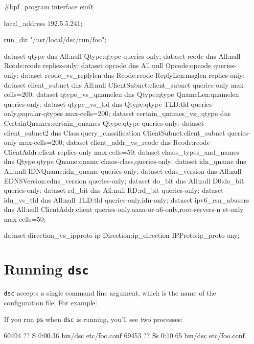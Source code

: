 \documentclass{report}
\begin{document}
\begin{MyVerbatim}
#bpf_program
interface em0;

local_address 192.5.5.241;

run_dir "/usr/local/dsc/run/foo";

dataset qtype dns All:null Qtype:qtype queries-only;
dataset rcode dns All:null Rcode:rcode replies-only;
dataset opcode dns All:null Opcode:opcode queries-only;
dataset rcode_vs_replylen dns Rcode:rcode ReplyLen:msglen replies-only;
dataset client_subnet dns All:null ClientSubnet:client_subnet queries-only
        max-cells=200;
dataset qtype_vs_qnamelen dns Qtype:qtype QnameLen:qnamelen queries-only;
dataset qtype_vs_tld dns Qtype:qtype TLD:tld queries-only,popular-qtypes
        max-cells=200;
dataset certain_qnames_vs_qtype dns CertainQnames:certain_qnames
        Qtype:qtype queries-only;
dataset client_subnet2 dns Class:query_classification
        ClientSubnet:client_subnet queries-only max-cells=200;
dataset client_addr_vs_rcode dns Rcode:rcode ClientAddr:client
        replies-only max-cells=50;
dataset chaos_types_and_names dns Qtype:qtype Qname:qname
        chaos-class,queries-only;
dataset idn_qname dns All:null IDNQname:idn_qname queries-only;
dataset edns_version dns All:null EDNSVersion:edns_version queries-only;
dataset do_bit dns All:null D0:do_bit queries-only;
dataset rd_bit dns All:null RD:rd_bit queries-only;
dataset idn_vs_tld dns All:null TLD:tld queries-only,idn-only;
dataset ipv6_rsn_abusers dns All:null ClientAddr:client
        queries-only,aaaa-or-a6-only,root-servers-n et-only max-cells=50;

dataset direction_vs_ipproto ip Direction:ip_direction IPProto:ip_proto
        any;
\end{MyVerbatim}

\section{Running {\tt dsc}}

{\tt dsc\/} accepts a single command line argument, which is
the name of the configuration file.  For example:

\begin{MyVerbatim}
\end{MyVerbatim}

If you run {\tt ps} when {\tt dsc} is running, you'll see two processes:

\begin{MyVerbatim}
60494  ??  S      0:00.36 bin/dsc etc/foo.conf
69453  ??  Ss     0:10.65 bin/dsc etc/foo.conf
\end{MyVerbatim}
\end{document}
